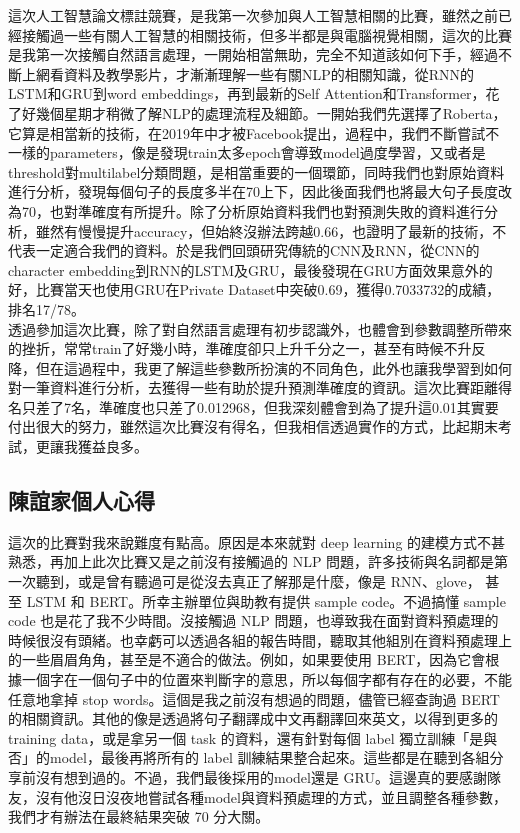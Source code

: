 \documentclass[8pt,a4paper]{article}
\begin{document}
這次人工智慧論文標註競賽，是我第一次參加與人工智慧相關的比賽，雖然之前已經接觸過一些有關人工智慧的相關技術，但多半都是與電腦視覺相關，這次的比賽是我第一次接觸自然語言處理，一開始相當無助，完全不知道該如何下手，經過不斷上網看資料及教學影片，才漸漸理解一些有關NLP的相關知識，從RNN的LSTM和GRU到word embeddings，再到最新的Self Attention和Transformer，花了好幾個星期才稍微了解NLP的處理流程及細節。一開始我們先選擇了Roberta，它算是相當新的技術，在2019年中才被Facebook提出，過程中，我們不斷嘗試不一樣的parameters，像是發現train太多epoch會導致model過度學習，又或者是threshold對multilabel分類問題，是相當重要的一個環節，同時我們也對原始資料進行分析，發現每個句子的長度多半在70上下，因此後面我們也將最大句子長度改為70，也對準確度有所提升。除了分析原始資料我們也對預測失敗的資料進行分析，雖然有慢慢提升accuracy，但始終沒辦法跨越0.66，也證明了最新的技術，不代表一定適合我們的資料。於是我們回頭研究傳統的CNN及RNN，從CNN的character embedding到RNN的LSTM及GRU，最後發現在GRU方面效果意外的好，比賽當天也使用GRU在Private Dataset中突破0.69，獲得0.7033732的成績，排名17/78。\\

透過參加這次比賽，除了對自然語言處理有初步認識外，也體會到參數調整所帶來的挫折，常常train了好幾小時，準確度卻只上升千分之一，甚至有時候不升反降，但在這過程中，我更了解這些參數所扮演的不同角色，此外也讓我學習到如何對一筆資料進行分析，去獲得一些有助於提升預測準確度的資訊。這次比賽距離得名只差了7名，準確度也只差了0.012968，但我深刻體會到為了提升這0.01其實要付出很大的努力，雖然這次比賽沒有得名，但我相信透過實作的方式，比起期末考試，更讓我獲益良多。 \\

\subsection*{陳誼家個人心得}

這次的比賽對我來說難度有點高。原因是本來就對 deep learning 的建模方式不甚熟悉，再加上此次比賽又是之前沒有接觸過的 NLP 問題，許多技術與名詞都是第一次聽到，或是曾有聽過可是從沒去真正了解那是什麼，像是 RNN、glove， 甚至 LSTM 和 BERT。所幸主辦單位與助教有提供 sample code。不過搞懂 sample code 也是花了我不少時間。沒接觸過 NLP 問題，也導致我在面對資料預處理的時候很沒有頭緒。也幸虧可以透過各組的報告時間，聽取其他組別在資料預處理上的一些眉眉角角，甚至是不適合的做法。例如，如果要使用 BERT，因為它會根據一個字在一個句子中的位置來判斷字的意思，所以每個字都有存在的必要，不能任意地拿掉 stop words。這個是我之前沒有想過的問題，儘管已經查詢過 BERT 的相關資訊。其他的像是透過將句子翻譯成中文再翻譯回來英文，以得到更多的 training data，或是拿另一個 task 的資料，還有針對每個 label 獨立訓練「是與否」的model，最後再將所有的 label 訓練結果整合起來。這些都是在聽到各組分享前沒有想到過的。不過，我們最後採用的model還是 GRU。這邊真的要感謝隊友，沒有他沒日沒夜地嘗試各種model與資料預處理的方式，並且調整各種參數，我們才有辦法在最終結果突破 70 分大關。\\
\end{document}
